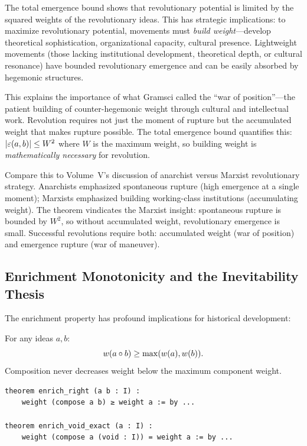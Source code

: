 \begin{interpretation}
The total emergence bound shows that revolutionary potential is limited by
the squared weights of the revolutionary ideas. This has strategic implications:
to maximize revolutionary potential, movements must \emph{build weight}---develop
theoretical sophistication, organizational capacity, cultural presence. Lightweight
movements (those lacking institutional development, theoretical depth, or cultural
resonance) have bounded revolutionary emergence and can be easily absorbed by
hegemonic structures.

This explains the importance of what Gramsci called the ``war of position''---the
patient building of counter-hegemonic weight through cultural and intellectual
work. Revolution requires not just the moment of rupture but the accumulated
weight that makes rupture possible. The total emergence bound quantifies this:
$|\varepsilon(a,b)| \leq W^2$ where $W$ is the maximum weight, so building weight
is \emph{mathematically necessary} for revolution.

Compare this to Volume~V's discussion of anarchist versus Marxist revolutionary
strategy. Anarchists emphasized spontaneous rupture (high emergence at a single
moment); Marxists emphasized building working-class institutions (accumulating
weight). The theorem vindicates the Marxist insight: spontaneous rupture is
bounded by $W^2$, so without accumulated weight, revolutionary emergence is
small. Successful revolutions require both: accumulated weight (war of position)
and emergence rupture (war of maneuver).
\end{interpretation}

\subsection{Enrichment Monotonicity and the Inevitability Thesis}

The enrichment property has profound implications for historical development:

\begin{theorem}
\label{thm:enrichment-monotonicity}
For any ideas $a, b$:
\[
  w(a \circ b) \geq \max(w(a), w(b)).
\]
Composition never decreases weight below the maximum component weight.
\end{theorem}

\begin{lstlisting}[caption={Enrichment monotone (IDT\_v3\_Emergence.lean)}]
theorem enrich_right (a b : I) :
    weight (compose a b) ≥ weight a := by ...
    
theorem enrich_void_exact (a : I) :
    weight (compose a (void : I)) = weight a := by ...
\end{lstlisting}


